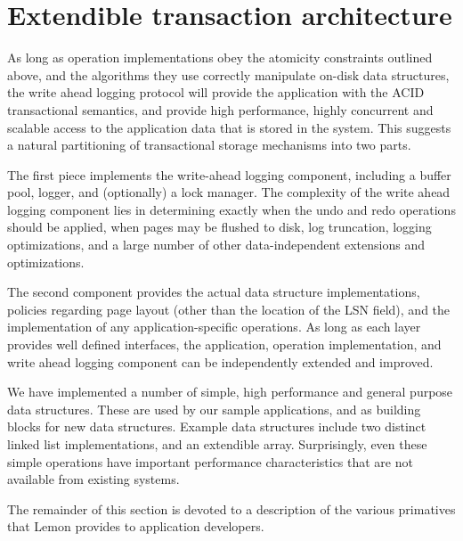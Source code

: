 \documentclass[letterpaper,twocolumn,english]{article}
\newcommand{\yad}{Lemon\xspace}
\begin{document}
\section{Extendible transaction architecture}

As long as operation implementations obey the atomicity constraints
outlined above, and the algorithms they use correctly manipulate
on-disk data structures, the write ahead logging protocol will provide
the application with the ACID transactional semantics, and provide
high performance, highly concurrent and scalable access to the
application data that is stored in the system.  This suggests a
natural partitioning of transactional storage mechanisms into two
parts.

The first piece implements the write-ahead logging component,
including a buffer pool, logger, and (optionally) a lock manager.  
The complexity of the write ahead logging component lies in
determining exactly when the undo and redo operations should be
applied, when pages may be flushed to disk, log truncation, logging
optimizations, and a large number of other data-independent extensions
and optimizations.

The second component provides the actual data structure
implementations, policies regarding page layout (other than the
location of the LSN field), and the implementation of any application-specific operations.
As long as each layer provides well defined interfaces, the application, 
operation implementation, and write ahead logging component can be 
independently extended and improved.

We have implemented a number of simple, high performance
and general purpose data structures.  These are used by our sample
applications, and as building blocks for new data structures.  Example
data structures include two distinct linked list implementations, and
an extendible array.  Surprisingly, even these simple operations have
important performance characteristics that are not available from
existing systems.

The remainder of this section is devoted to a description of the
various primatives that \yad provides to application developers.


\end{document}
